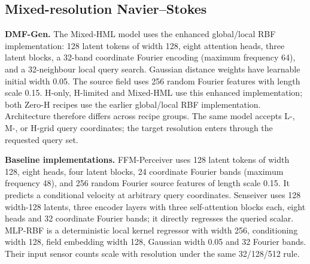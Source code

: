 \documentclass[11pt]{article}
\newcommand{\sisubsection}[1]{%
\FloatBarrier
\Needspace{5\baselineskip}%
\subsection{#1}%
}
\newcommand{\detail}[1]{\par\Needspace{4\baselineskip}\textbf{#1}\enspace}
\begin{document}
\sisubsection{Mixed-resolution Navier--Stokes}
\label{subsec:model-mixed}
\detail{DMF-Gen.}
{
The Mixed-HML model uses the enhanced global/local RBF implementation: 128 latent tokens of width 128, eight attention heads, three latent blocks, a 32-band coordinate Fourier encoding (maximum frequency 64), and a 32-neighbour local query search. Gaussian distance weights have learnable initial width 0.05. The source field uses 256 random Fourier features with length scale 0.15. H-only, H-limited and Mixed-HML use this enhanced implementation; both Zero-H recipes use the earlier global/local RBF implementation. Architecture therefore differs across recipe groups. The same model accepts L-, M-, or H-grid query coordinates; the target resolution enters through the requested query set.
}
\detail{Baseline implementations.}
{
FFM-Perceiver uses 128 latent tokens of width 128, eight heads, four latent blocks, 24 coordinate Fourier bands (maximum frequency 48), and 256 random Fourier source features of length scale 0.15. It predicts a conditional velocity at arbitrary query coordinates. Senseiver uses 128 width-128 latents, three encoder layers with three self-attention blocks each, eight heads and 32 coordinate Fourier bands; it directly regresses the queried scalar. MLP-RBF is a deterministic local kernel regressor with width 256, conditioning width 128, field embedding width 128, Gaussian width 0.05 and 32 Fourier bands. Their input sensor counts scale with resolution under the same 32/128/512 rule.
}
\end{document}
